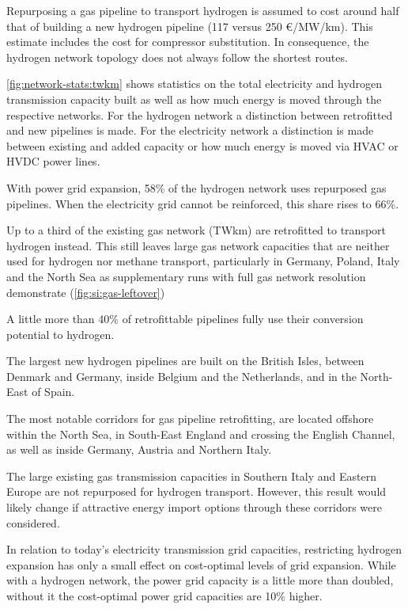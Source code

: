 Repurposing a gas pipeline to transport hydrogen is assumed to cost around half
that of building a new hydrogen pipeline (117 versus 250 \euro/MW/km). This
estimate includes the cost for compressor substitution. In consequence, the
hydrogen network topology does not always follow the shortest routes.

\cref{fig:network-stats:twkm} shows statistics on the total electricity and
hydrogen transmission capacity built as well as how much energy is moved through
the respective networks. For the hydrogen network a distinction between
retrofitted and new pipelines is made. For the electricity network a distinction
is made between existing and added capacity or how much energy is moved via HVAC
or HVDC power lines.

With power grid expansion, 58\% of the hydrogen network uses repurposed gas
pipelines. When the electricity grid cannot be reinforced, this share rises to
66\%.

Up to a third of the existing gas network (TWkm) are retrofitted to transport
hydrogen instead. This still leaves large  gas network capacities that are
neither used for hydrogen nor methane transport, particularly in Germany,
Poland, Italy and the North Sea as supplementary runs with full gas network
resolution demonstrate (\cref{fig:si:gas-leftover})

A little more than 40\% of retrofittable pipelines fully use their conversion
potential to hydrogen.

The largest new hydrogen pipelines are built on the British Isles, between
Denmark and Germany, inside Belgium and the Netherlands, and in the North-East
of Spain.

The most notable corridors for gas pipeline retrofitting, are located offshore
within the North Sea, in South-East England and crossing the English Channel, as
well as inside Germany, Austria and Northern Italy.

The large existing gas transmission capacities in Southern Italy and Eastern
Europe are not repurposed for hydrogen transport. However, this result would
likely change if attractive energy import options through these corridors were
considered.

In relation to today's electricity transmission grid capacities, restricting
hydrogen expansion has only a small effect on cost-optimal levels of grid
expansion. While with a hydrogen network, the power grid capacity is a little
more than doubled, without it the cost-optimal power grid capacities are 10\%
higher.

